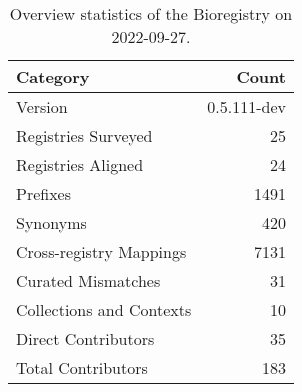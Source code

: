 \begin{table}
\centering
\caption{Overview statistics of the Bioregistry on 2022-09-27.}
\label{tab:bioregistry-summary}
\begin{tabular}{lr}
\toprule
                Category &       Count \\
\midrule
                 Version & 0.5.111-dev \\
     Registries Surveyed &          25 \\
      Registries Aligned &          24 \\
                Prefixes &        1491 \\
                Synonyms &         420 \\
 Cross-registry Mappings &        7131 \\
      Curated Mismatches &          31 \\
Collections and Contexts &          10 \\
     Direct Contributors &          35 \\
      Total Contributors &         183 \\
\bottomrule
\end{tabular}
\end{table}
